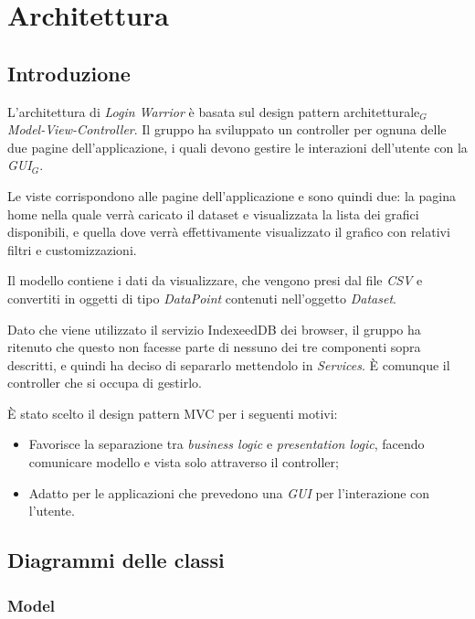 \chapter{Architettura}
\section{Introduzione}
L'architettura di \textit{Login Warrior} è basata sul design pattern architetturale$_G$ \textit{Model-View-Controller}. Il gruppo ha sviluppato un controller per ognuna delle due pagine dell'applicazione, i quali devono gestire le interazioni dell'utente con la \textit{GUI}$_G$.

 Le viste corrispondono alle pagine dell'applicazione e sono quindi due: la pagina home nella quale verrà caricato il dataset e visualizzata la lista dei grafici disponibili, e quella dove verrà effettivamente visualizzato il grafico con relativi filtri e customizzazioni.

 Il modello contiene i dati da visualizzare, che vengono presi dal file \textit{CSV} e convertiti in oggetti di tipo \textit{DataPoint} contenuti nell'oggetto \textit{Dataset}.

 Dato che viene utilizzato il servizio IndexeedDB dei browser, il gruppo ha ritenuto che questo non facesse parte di nessuno dei tre componenti sopra descritti, e quindi ha deciso di separarlo mettendolo in \textit{Services}. È comunque il controller che si occupa di gestirlo.


È stato scelto il design pattern MVC per i seguenti motivi:
\begin{itemize}
  \item Favorisce la separazione tra \textit{business logic} e \textit{presentation logic}, facendo comunicare modello e vista solo attraverso il controller;
  \item Adatto per le applicazioni che prevedono una \textit{GUI} per l'interazione con l'utente.
\end{itemize}
\section{Diagrammi delle classi}
\subsection{Model}

